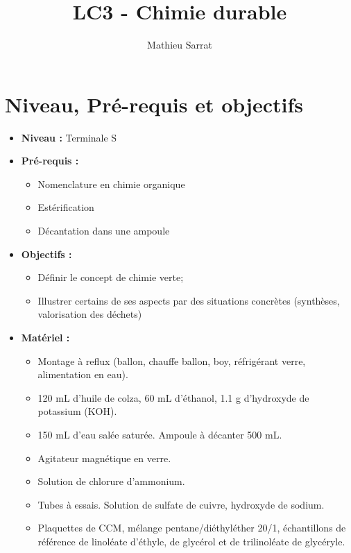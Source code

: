 \documentclass[11pt,a4paper]{report}
\author{Mathieu Sarrat}
\title{LC3 - Chimie durable}
\begin{document}
\maketitle

\section*{Niveau, Pré-requis et objectifs}
\begin{itemize}
	\item \textbf{Niveau :} Terminale S\\
	
	\item \textbf{Pré-requis :}
	\begin{itemize}
		\item Nomenclature en chimie organique
		\item Estérification
		\item Décantation dans une ampoule\\
	\end{itemize}
	
	\item \textbf{Objectifs :}
	\begin{itemize}
		\item Définir le concept de chimie verte;
		\item Illustrer certains de ses aspects par des situations concrètes (synthèses, valorisation 				des déchets)\\
	\end{itemize}
		
	\item \textbf{Matériel :}
	\begin{itemize}
		\item Montage à reflux (ballon, chauffe ballon, boy, réfrigérant verre, alimentation en eau).
		\item 120 mL d'huile de colza, 60 mL d'éthanol, 1.1 g d'hydroxyde de potassium (KOH).
		\item 150 mL d'eau salée saturée. Ampoule à décanter 500 mL.
		\item Agitateur magnétique en verre.
		\item Solution de chlorure d'ammonium.\\
		
		\item Tubes à essais. Solution de sulfate de cuivre, hydroxyde de sodium.\\
		
		\item Plaquettes de CCM, mélange pentane/diéthyléther 20/1, échantillons de référence de 					linoléate d'éthyle, de glycérol et de trilinoléate de glycéryle.\\
		

\end{itemize}
\end{itemize}
\end{document}
